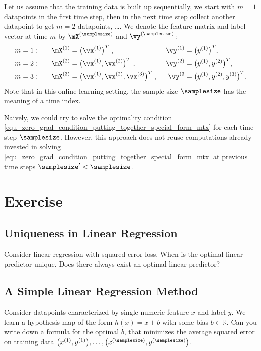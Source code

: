 \documentclass[12pt]{report}
\begin{document}
Let us assume that the training data is built up sequentially, we start with $m=1$ datapoints 
in the first time step, then in the next time step collect another datapoint to get 
$m=2$ datapoints, \ldots. We denote the feature matrix and label vector at time $m$ 
by $\mX^{(\samplesize)}$ and $\vy^{(\samplesize)}$: 
\begin{align}
m&=1: \quad &\mX^{(1)} & = \big( \vx^{(1)} \big)^{T}  \mbox{ , } & \vy^{(1)} & = \big( y^{(1)} \big)^{T} \mbox{, } \\ 
m&=2: \quad &\mX^{(2)} & = \big( \vx^{(1)},\vx^{(2)} \big)^{T}  \mbox{ , } & \vy^{(2)} & = \big( y^{(1)},y^{(2)} \big)^{T} \mbox{, } \\ 
m&=3: \quad &\mX^{(3)} & = \big( \vx^{(1)},\vx^{(2)},\vx^{(3)} \big)^{T}  \mbox{ , } & \vy^{(3} & = \big( y^{(1)},y^{(2)},y^{(3)} \big)^{T}.
\end{align} 
Note that in this online learning setting, the sample size $\samplesize$ has the meaning of a time index. 

Naively, we could try to solve the optimality condition \eqref{equ_zero_grad_condition_putting_together_special_form_mtx} 
for each time step $\samplesize$. However, this approach does not reuse computations already invested 
in solving \eqref{equ_zero_grad_condition_putting_together_special_form_mtx} at previous time steps $\samplesize' < \samplesize$. 





\section{Exercise} 
\label{sec_exercise_chap_4} 

\subsection{Uniqueness in Linear Regression}
\label{ex_chap_5_lin_reg} 
Consider linear regression with squared error loss. When 
is the optimal linear predictor unique. Does there always exist an optimal linear predictor?


\subsection{A Simple Linear Regression Method}
\label{ex_chap_5_bias}
Consider datapoints characterized by single numeric feature $x$ 
and label $y$. We learn a hypothesis map of the form $h(x) = x + b$ 
with some bias $b \in \mathbb{R}$. Can you write down a formula 
for the optimal $b$, that minimizes the average squared error on 
training data $\big(x^{(1)},y^{(1)} \big),\ldots,\big(x^{(\samplesize)},y^{(\samplesize)}\big)$.   
	
\end{document}
